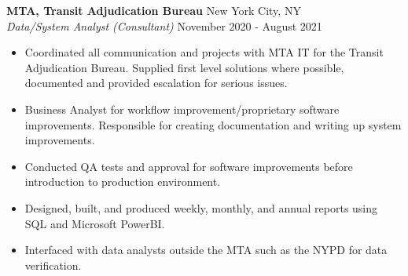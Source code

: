 \documentclass[a4paper]{article}
\begin{document}
\textbf{MTA, Transit Adjudication Bureau} \hfill New York City, NY\\
\textit{Data/System Analyst (Consultant)} \hfill November 2020 - August 2021\\
\vspace{-1mm}
\begin{itemize} \itemsep 1pt
	\item Coordinated all communication and projects with MTA IT for the Transit Adjudication Bureau. Supplied first level solutions where possible, documented and provided escalation for serious issues.
	\item Business Analyst for workflow improvement/proprietary software improvements. Responsible for creating documentation and writing up system improvements.
	\item Conducted QA tests and approval for software improvements before introduction to production environment.
	\item Designed, built, and produced weekly, monthly, and annual reports using SQL and Microsoft PowerBI.
	\item Interfaced with data analysts outside the MTA such as the NYPD for data verification.
\end{itemize}
\end{document}
